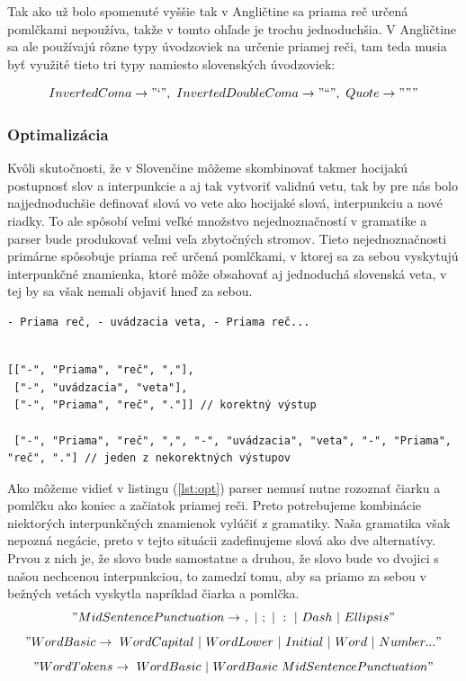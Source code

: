 \documentclass[12pt,a4paper]{report}
\theoremstyle{definition}
\theoremstyle{remark}
\begin{document}
Tak ako už bolo spomenuté vyššie tak v Angličtine sa priama reč určená pomlčkami nepoužíva, takže v tomto ohľade je trochu jednoduchšia. V Angličtine sa ale používajú rôzne typy úvodzoviek na určenie priamej reči, tam teda musia byť využité tieto tri typy namiesto slovenských úvodzoviek:

$$InvertedComa \to "\text{`}", \ InvertedDoubleComa \to"\text{``}", \  Quote \to """$$

\subsubsection{Optimalizácia}
Kvôli skutočnosti, že v Slovenčine môžeme skombinovať takmer hocijakú postupnosť slov a interpunkcie a aj tak vytvoriť validnú vetu, tak by pre nás bolo najjednoduchšie definovať slová vo vete ako hocijaké slová, interpunkciu a nové riadky. To ale spôsobí veľmi veľké množstvo nejednoznačností v gramatike a parser bude produkovať veľmi veľa zbytočných stromov. Tieto nejednoznačnosti primárne spôsobuje priama reč určená pomlčkami, v ktorej sa za sebou vyskytujú interpunkčné znamienka, ktoré môže obsahovať aj jednoduchá slovenská veta, v tej by sa však nemali objaviť hneď za sebou.
\begin{lstlisting}[caption={Nejednoznačný vstup},style=htmlcssjs]
- Priama reč, - uvádzacia veta, - Priama reč...
\end{lstlisting}
\begin{lstlisting}[caption={Výstupné vety vo forme polí},style=htmlcssjs, label={lst:opt}]

[["-", "Priama", "reč", ","],
 ["-", "uvádzacia", "veta"],
 ["-", "Priama", "reč", "."]] // korektný výstup
 
 ["-", "Priama", "reč", ",", "-", "uvádzacia", "veta", "-", "Priama", "reč", "."] // jeden z nekorektných výstupov
\end{lstlisting}
Ako môžeme vidieť v listingu (\ref{lst:opt}) parser nemusí nutne rozoznať čiarku a pomlčku ako koniec a začiatok priamej reči. Preto potrebujeme kombinácie niektorých interpunkčných znamienok vylúčiť z gramatiky. Naša gramatika však nepozná negácie, preto v tejto situácii zadefinujeme slová ako dve alternatívy. Prvou z nich je, že slovo bude samostatne a druhou, že slovo bude vo dvojici s našou nechcenou interpunkciou, to zamedzí tomu, aby sa priamo za sebou v bežných vetách vyskytla napríklad čiarka a pomlčka.
$$"MidSentencePunctuation \to \ , \ | \ ; \ | \ : \ | \ Dash \  | \ Ellipsis"$$
$$"WordBasic \to  \ WordCapital \ | \ WordLower \ | \ Initial \ | \ Word \ | \ Number ..."$$
$$"WordTokens  \to\  WordBasic \ | \ WordBasic \ MidSentencePunctuation"$$
\end{document}
